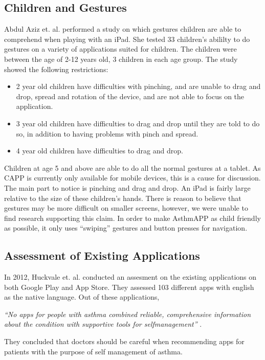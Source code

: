 \subsection{Children and Gestures}

Abdul Aziz et. al. \cite{aziz2013children} performed a study on which gestures children are able to comprehend when playing with an iPad. She tested 33 children's abililty to do gestures on a variety of applications suited for children. The children were between the age of 2-12 years old, 3 children in each age group. The study showed the following restrictions:

\begin{itemize}
  \item 2 year old children have difficulties with pinching, and are unable to drag and drop, spread and rotation of the device, and are not able to focus on the application. 
  \item 3 year old children have difficulties to drag and drop until they are told to do so, in addition to having problems with pinch and spread. 
  \item 4 year old children have difficulties to drag and drop. 
\end{itemize}
Children at age 5 and above are able to do all the normal gestures at a tablet. As CAPP is currently only available for mobile devices, this is a cause for discussion. The main part to notice is pinching and drag and drop. An iPad is fairly large relative to the size of these children's hands. There is reason to believe that gestures may be more difficult on smaller screens, however, we were unable to find research supporting this claim. In order to make AsthmAPP as child friendly as possible, it only uses ``swiping'' gestures and button presses for navigation.

\subsection{Assessment of Existing Applications}
In 2012, Huckvale et. al. \cite{huckvale2012apps} conducted an assesment on the existing applications on both Google Play and App Store. They assessed 103 different apps with english as the native language. Out of these applications, 


\emph{``No apps for people with asthma combined reliable, comprehensive information about the condition with supportive tools for self­management''} \cite{huckvale2012apps}. 


They concluded that doctors should be careful when recommending apps for patients with the purpose of self management of asthma.